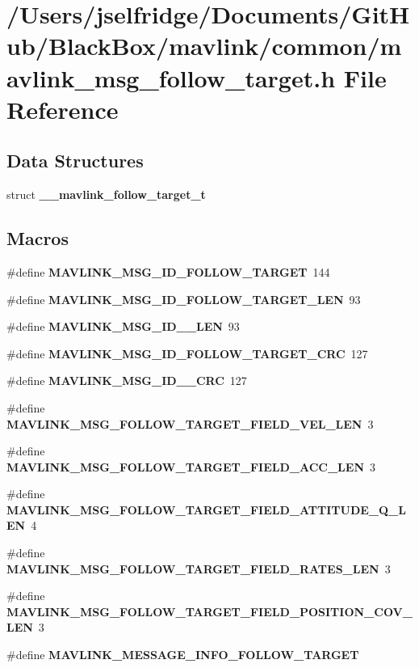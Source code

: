 \section{/\+Users/jselfridge/\+Documents/\+Git\+Hub/\+Black\+Box/mavlink/common/mavlink\+\_\+msg\+\_\+follow\+\_\+target.h File Reference}
\label{mavlink__msg__follow__target_8h}
\subsection*{Data Structures}
\begin{DoxyCompactItemize}
\item 
struct \textbf{ \+\_\+\+\_\+mavlink\+\_\+follow\+\_\+target\+\_\+t}
\end{DoxyCompactItemize}
\subsection*{Macros}
\begin{DoxyCompactItemize}
\item 
\#define \textbf{ M\+A\+V\+L\+I\+N\+K\+\_\+\+M\+S\+G\+\_\+\+I\+D\+\_\+\+F\+O\+L\+L\+O\+W\+\_\+\+T\+A\+R\+G\+ET}~144
\item 
\#define \textbf{ M\+A\+V\+L\+I\+N\+K\+\_\+\+M\+S\+G\+\_\+\+I\+D\+\_\+\+F\+O\+L\+L\+O\+W\+\_\+\+T\+A\+R\+G\+E\+T\+\_\+\+L\+EN}~93
\item 
\#define \textbf{ M\+A\+V\+L\+I\+N\+K\+\_\+\+M\+S\+G\+\_\+\+I\+D\+\_\+\_\+\+L\+EN}~93
\item 
\#define \textbf{ M\+A\+V\+L\+I\+N\+K\+\_\+\+M\+S\+G\+\_\+\+I\+D\+\_\+\+F\+O\+L\+L\+O\+W\+\_\+\+T\+A\+R\+G\+E\+T\+\_\+\+C\+RC}~127
\item 
\#define \textbf{ M\+A\+V\+L\+I\+N\+K\+\_\+\+M\+S\+G\+\_\+\+I\+D\+\_\+\_\+\+C\+RC}~127
\item 
\#define \textbf{ M\+A\+V\+L\+I\+N\+K\+\_\+\+M\+S\+G\+\_\+\+F\+O\+L\+L\+O\+W\+\_\+\+T\+A\+R\+G\+E\+T\+\_\+\+F\+I\+E\+L\+D\+\_\+\+V\+E\+L\+\_\+\+L\+EN}~3
\item 
\#define \textbf{ M\+A\+V\+L\+I\+N\+K\+\_\+\+M\+S\+G\+\_\+\+F\+O\+L\+L\+O\+W\+\_\+\+T\+A\+R\+G\+E\+T\+\_\+\+F\+I\+E\+L\+D\+\_\+\+A\+C\+C\+\_\+\+L\+EN}~3
\item 
\#define \textbf{ M\+A\+V\+L\+I\+N\+K\+\_\+\+M\+S\+G\+\_\+\+F\+O\+L\+L\+O\+W\+\_\+\+T\+A\+R\+G\+E\+T\+\_\+\+F\+I\+E\+L\+D\+\_\+\+A\+T\+T\+I\+T\+U\+D\+E\+\_\+\+Q\+\_\+\+L\+EN}~4
\item 
\#define \textbf{ M\+A\+V\+L\+I\+N\+K\+\_\+\+M\+S\+G\+\_\+\+F\+O\+L\+L\+O\+W\+\_\+\+T\+A\+R\+G\+E\+T\+\_\+\+F\+I\+E\+L\+D\+\_\+\+R\+A\+T\+E\+S\+\_\+\+L\+EN}~3
\item 
\#define \textbf{ M\+A\+V\+L\+I\+N\+K\+\_\+\+M\+S\+G\+\_\+\+F\+O\+L\+L\+O\+W\+\_\+\+T\+A\+R\+G\+E\+T\+\_\+\+F\+I\+E\+L\+D\+\_\+\+P\+O\+S\+I\+T\+I\+O\+N\+\_\+\+C\+O\+V\+\_\+\+L\+EN}~3
\item 
\#define \textbf{ M\+A\+V\+L\+I\+N\+K\+\_\+\+M\+E\+S\+S\+A\+G\+E\+\_\+\+I\+N\+F\+O\+\_\+\+F\+O\+L\+L\+O\+W\+\_\+\+T\+A\+R\+G\+ET}
\end{DoxyCompactItemize}
